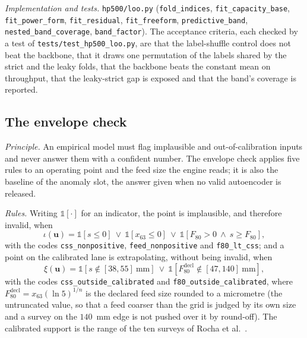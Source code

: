 \emph{Implementation and tests.} \texttt{hp500/\allowbreak{}loo.py} (\texttt{fold\_indices}, \texttt{fit\_capacity\_base}, \texttt{fit\_power\_form},
\texttt{fit\_residual}, \texttt{fit\_freeform}, \texttt{predictive\_band}, \texttt{nested\_band\_coverage}, \texttt{band\_factor}). The acceptance
criteria, each checked by a test of \texttt{tests/\allowbreak{}test\_hp500\_loo.py}, are that the label-shuffle control does not beat the backbone, that
it draws one permutation of the labels shared by the strict and the leaky folds, that the backbone beats the constant mean on throughput, that
the leaky-strict gap is exposed and that the band's coverage is reported.

\subsection{The envelope check}\label{sec:m-envelope}

\emph{Principle.} An empirical model must flag implausible and out-of-calibration inputs and never answer them with a confident number. The envelope
check applies five rules to an operating point and the feed size the engine reads; it is also the baseline of the anomaly slot, the answer given when
no valid autoencoder is released.

\emph{Rules.} Writing $\mathbb 1[\cdot]$ for an indicator, the point is implausible, and therefore invalid, when
\begin{equation}
\iota(\mathbf u) = \mathbb 1[s\le0]\ \lor\ \mathbb 1[x_{63}\le0]\ \lor\ \mathbb 1[F_{80}>0\ \land\ s\ge F_{80}],
\label{eq:implausible}
\end{equation}
with the codes \texttt{css\_nonpositive}, \texttt{feed\_nonpositive} and \texttt{f80\_lt\_css}; and a point on the calibrated lane is extrapolating,
without being invalid, when
\begin{equation}
\xi(\mathbf u) = \mathbb 1[s\notin[38,55]\ \mathrm{mm}]\ \lor\ \mathbb 1[F^{\mathrm{decl}}_{80}\notin[47,140]\ \mathrm{mm}],
\label{eq:extrapolating}
\end{equation}
with the codes \texttt{css\_outside\_calibrated} and \texttt{f80\_outside\_calibrated}, where $F^{\mathrm{decl}}_{80}=x_{63}(\ln5)^{1/n}$ is the
declared feed size rounded to a micrometre (the untruncated value, so that a feed coarser than the grid is judged by its own size and a survey on
the $140$~mm edge is not pushed over it by round-off). The calibrated support is the range of the ten surveys of Rocha et al.~\cite{rocha2024}.

